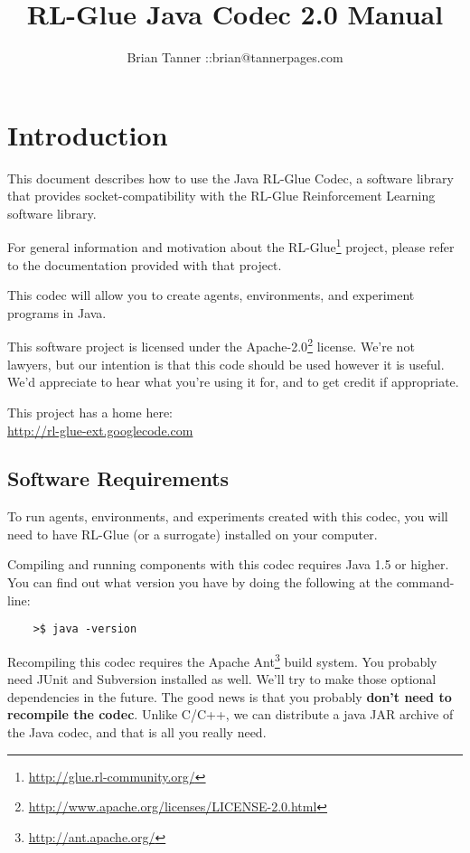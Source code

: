 \documentclass[11pt]{article}
\title{RL-Glue Java Codec 2.0 Manual }
\author{Brian Tanner ::brian@tannerpages.com}
\begin{document}
\maketitle
\tableofcontents

\section{Introduction}

This document describes how to use the Java RL-Glue Codec, a software library that provides socket-compatibility with the RL-Glue Reinforcement Learning software library.  

For general information and motivation about the RL-Glue\footnote{\url{http://glue.rl-community.org/}} project, please refer to the documentation provided with that project.

This codec will allow you to create agents, environments, and experiment programs in Java.

This software project is licensed under the Apache-2.0\footnote{\url{http://www.apache.org/licenses/LICENSE-2.0.html}} license. We're not lawyers, but our intention is that this code 
should be used however it is useful.  We'd appreciate to hear what you're using it for, and to get credit if appropriate.

This project has a home here:\\
\url{http://rl-glue-ext.googlecode.com}



\subsection{Software Requirements}
To run agents, environments, and experiments created with this codec, you will need to have RL-Glue (or a surrogate) installed on your computer.

Compiling and running components with this codec requires Java 1.5 or higher. You can find out what version you have by doing the following at the command-line:
\begin{verbatim}
	>$ java -version
\end{verbatim}

Recompiling this codec requires the Apache Ant\footnote{\url{http://ant.apache.org/}} build system.  You probably need JUnit and Subversion installed as well. We'll try to make those optional dependencies in the future.
The good news is that you probably \textbf{don't need to recompile the codec}.  Unlike C/C++, we can distribute a java JAR archive of the Java codec, and that is all you really need.
\end{document}
